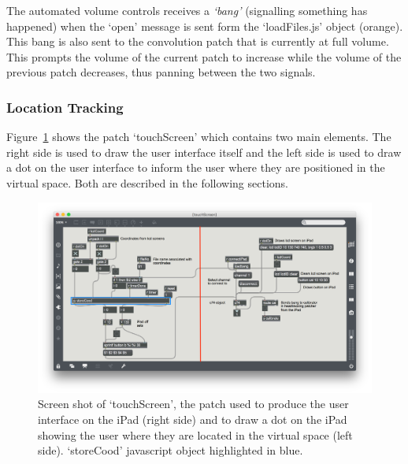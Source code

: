 \documentclass[../../main.tex]{subfiles}
\begin{document}
		 	The automated volume controls receives a \textit{`bang'} (signalling something has happened) when the `open' message is sent form the `loadFiles.js' object (orange). This bang is also sent to the convolution patch that is currently at full volume. This prompts the volume of the current patch to increase while the volume of the previous patch decreases, thus panning between the two signals.


	\subsubsection{Location Tracking}
	\label{locationtracking}
	Figure~\ref{touchScreenPatch} shows the patch `touchScreen' which contains two main elements. The right side is used to draw the user interface itself and the left side is used to draw a dot on the user interface to inform the user where they are positioned in the virtual space. Both are described in the following sections.

		\begin{figure}
			\centerline{\includegraphics[width=\textwidth]{Sections/Implementation/Max/images/Max/UserInterface/pTouchScreen_edit.png}}
			\caption{Screen shot of `touchScreen', the patch used to produce the user interface on the iPad (right side) and to draw a dot on the iPad showing the user where they are located in the virtual space (left side). `storeCood' javascript object highlighted in blue.}
			\label{touchScreenPatch}
		\end{figure}
\end{document}
